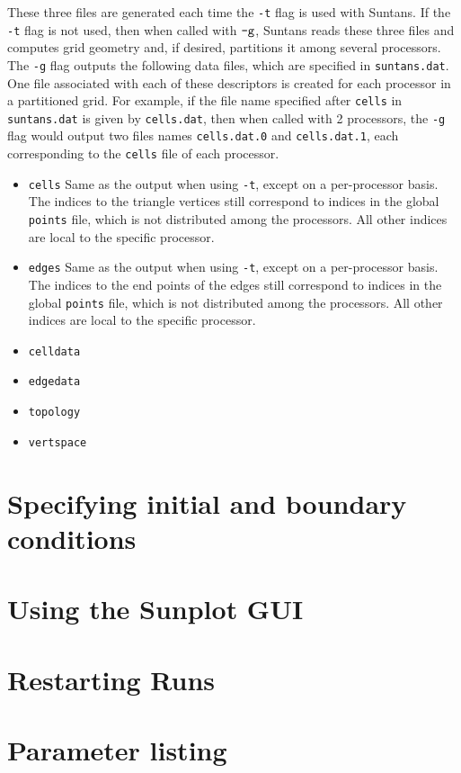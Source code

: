 \documentclass[12pt,oneside]{article}
\begin{document}
These three files are generated each time the \verb+-t+ flag is used with Suntans.  If
the \verb+-t+ flag is not used, then when called with $\verb+-g+$, Suntans reads these
three files and computes grid geometry and, if desired, partitions it among several processors.
The \verb+-g+ flag outputs the following data files, which are specified in \verb+suntans.dat+.
One file associated with each of these descriptors is created for each processor in a partitioned
grid.  For example, if the file name specified after \verb+cells+ in \verb+suntans.dat+ is given
by \verb+cells.dat+, then when called with 2 processors, the \verb+-g+ flag would output two files
names \verb+cells.dat.0+ and \verb+cells.dat.1+, each corresponding to the \verb+cells+ file of
each processor.
\begin{itemize}
\item \verb+cells+ Same as the output when using \verb+-t+, except on a per-processor basis.
The indices to the triangle vertices still correspond to indices in the global \verb+points+ file, which is
not distributed among the processors.  All other indices are local to the specific processor.
\item \verb+edges+ Same as the output when using \verb+-t+, except on a per-processor basis.
The indices to the end points of the edges still correspond to indices in the global \verb+points+ file, which is
not distributed among the processors.  All other indices are local to the specific processor.
\item \verb+celldata+ 
\item \verb+edgedata+
\item \verb+topology+
\item \verb+vertspace+
\end{itemize}

\section{Specifying initial and boundary conditions} \label{sec:initial}

\section{Using the Sunplot GUI}

\section{Restarting Runs} \label{sec:restart}

\appendix

\section{Parameter listing} \label{app:params}



\end{document}
